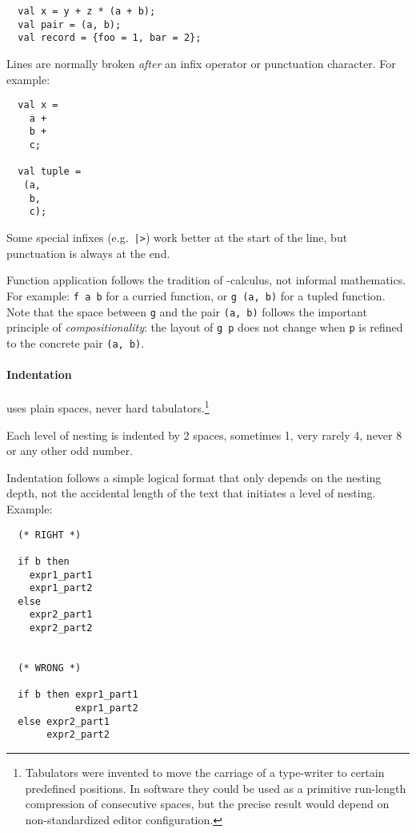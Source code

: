 \begin{isabellebody}
\begin{isamarkuptext}
  \begin{verbatim}
  val x = y + z * (a + b);
  val pair = (a, b);
  val record = {foo = 1, bar = 2};
  \end{verbatim}

  Lines are normally broken \emph{after} an infix operator or
  punctuation character.  For example:

  \begin{verbatim}
  val x =
    a +
    b +
    c;

  val tuple =
   (a,
    b,
    c);
  \end{verbatim}

  Some special infixes (e.g.\ \verb||\verb,|,\verb|>|) work better at the
  start of the line, but punctuation is always at the end.

  Function application follows the tradition of -calculus,
  not informal mathematics.  For example: \verb|f a b| for a
  curried function, or \verb|g (a, b)| for a tupled function.
  Note that the space between \verb|g| and the pair \verb|(a, b)| follows the important principle of
  \emph{compositionality}: the layout of \verb|g p| does not
  change when \verb|p| is refined to the concrete pair
  \verb|(a, b)|.

  \paragraph{Indentation} uses plain spaces, never hard
  tabulators.\footnote{Tabulators were invented to move the carriage
  of a type-writer to certain predefined positions.  In software they
  could be used as a primitive run-length compression of consecutive
  spaces, but the precise result would depend on non-standardized
  editor configuration.}

  Each level of nesting is indented by 2 spaces, sometimes 1, very
  rarely 4, never 8 or any other odd number.

  Indentation follows a simple logical format that only depends on the
  nesting depth, not the accidental length of the text that initiates
  a level of nesting.  Example:

  \begin{verbatim}
  (* RIGHT *)

  if b then
    expr1_part1
    expr1_part2
  else
    expr2_part1
    expr2_part2


  (* WRONG *)

  if b then expr1_part1
            expr1_part2
  else expr2_part1
       expr2_part2
  \end{verbatim}


\end{isamarkuptext}
\end{isabellebody}
